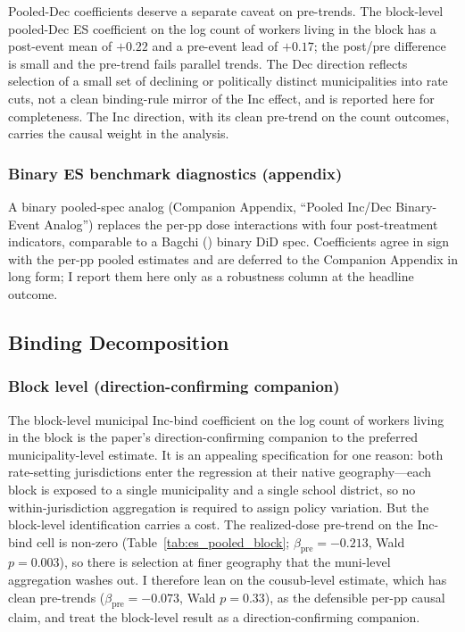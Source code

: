 \documentclass[12pt]{article}
\begin{document}
Pooled-Dec coefficients deserve a separate caveat on pre-trends. The block-level
pooled-Dec ES coefficient on the log count of workers living in the
block has a post-event mean of $+0.22$ and a pre-event lead of $+0.17$;
the post/pre difference is small and the pre-trend fails parallel
trends. The Dec direction reflects selection of a small set of
declining or politically distinct municipalities into rate cuts, not a clean
binding-rule mirror of the Inc effect, and is reported here for
completeness. The Inc direction, with its clean pre-trend on the
count outcomes, carries the causal weight in the analysis.

\subsubsection{Binary ES benchmark diagnostics (appendix)}
\label{subsubsec:pooled-binary-es}

A binary pooled-spec analog
(Companion Appendix, ``Pooled Inc/Dec Binary-Event Analog'')
replaces the per-pp dose interactions with four post-treatment
indicators, comparable to a Bagchi
(\citeyear{bagchiEffectsIntroducingWithholding2022}) binary DiD spec.
Coefficients agree in sign with the per-pp pooled estimates and are
deferred to the Companion Appendix in long form; I report them here
only as a robustness column at the headline outcome.

\subsection{Binding Decomposition}
\label{subsec:results-decomp}

\subsubsection{Block level (direction-confirming companion)}
\label{subsec:results-block}

The block-level municipal Inc-bind coefficient on the log count of
workers living in the block is the paper's direction-confirming
companion to the preferred municipality-level estimate. It is an
appealing specification for one reason: both rate-setting jurisdictions
enter the regression at their native geography---each block is exposed
to a single municipality and a single school district, so no
within-jurisdiction aggregation is required to assign policy variation.
But the block-level identification carries a cost. The realized-dose
pre-trend on the Inc-bind cell is non-zero
(Table~\ref{tab:es_pooled_block}; $\beta_{\text{pre}} = -0.213$,
Wald $p=0.003$), so there is selection at finer geography that the
muni-level aggregation washes out. I therefore lean on the
cousub-level estimate, which has clean pre-trends
($\beta_{\text{pre}} = -0.073$, Wald $p=0.33$), as the defensible
per-pp causal claim, and treat the block-level result as a
direction-confirming companion.
\end{document}
